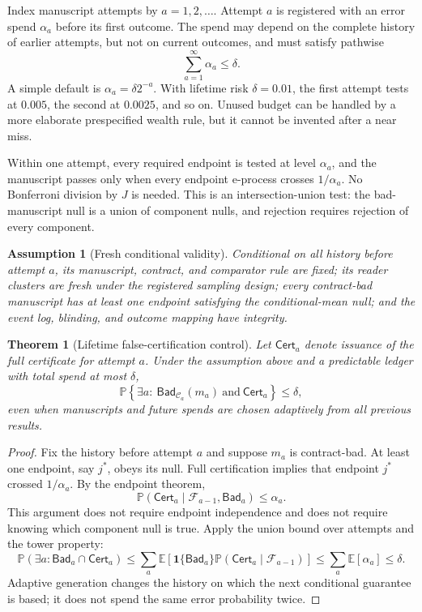 \documentclass[11pt]{article}
\newtheorem{assumption}{Assumption}
\newtheorem{theorem}{Theorem}
\theoremstyle{remark}
\newcommand{\bad}{\mathsf{Bad}}
\newcommand{\cert}{\mathsf{Cert}}
\newcommand{\E}{\mathbb{E}}
\newcommand{\Prb}{\mathbb{P}}
\newcommand{\ind}{\mathbf{1}}
\begin{document}
Index manuscript attempts by $a=1,2,\ldots$. Attempt $a$ is registered with an error spend
$\alpha_a$ before its first outcome. The spend may depend on the complete history of earlier
attempts, but not on current outcomes, and must satisfy pathwise
\[
  \sum_{a=1}^{\infty}\alpha_a\leq\delta.
\]
A simple default is $\alpha_a=\delta 2^{-a}$. With lifetime risk $\delta=0.01$, the first
attempt tests at $0.005$, the second at $0.0025$, and so on. Unused budget can be handled by a
more elaborate prespecified wealth rule, but it cannot be invented after a near miss.

Within one attempt, every required endpoint is tested at level $\alpha_a$, and the manuscript
passes only when every endpoint e-process crosses $1/\alpha_a$. No Bonferroni division by
$J$ is needed. This is an intersection-union test: the bad-manuscript null is a union of
component nulls, and rejection requires rejection of every component.

\begin{assumption}[Fresh conditional validity]
Conditional on all history before attempt $a$, its manuscript, contract, and comparator rule
are fixed; its reader clusters are fresh under the registered sampling design; every
contract-bad manuscript has at least one endpoint satisfying the conditional-mean null; and
the event log, blinding, and outcome mapping have integrity.
\end{assumption}

\begin{theorem}[Lifetime false-certification control]
Let $\cert_a$ denote issuance of the full certificate for attempt $a$. Under the assumption
above and a predictable ledger with total spend at most $\delta$,
\[
 \Prb\!\left\{\exists a:\ \bad_{\mathcal C_a}(m_a)
                 \ \text{and}\ \cert_a\right\}\leq\delta,
\]
even when manuscripts and future spends are chosen adaptively from all previous results.
\end{theorem}

\begin{proof}
Fix the history before attempt $a$ and suppose $m_a$ is contract-bad. At least one endpoint,
say $j^*$, obeys its null. Full certification implies that endpoint $j^*$ crossed
$1/\alpha_a$. By the endpoint theorem,
\[
 \Prb(\cert_a\mid\mathcal F_{a-1},\bad_a)\leq\alpha_a.
\]
This argument does not require endpoint independence and does not require knowing which
component null is true. Apply the union bound over attempts and the tower property:
\[
 \Prb(\exists a:\bad_a\cap\cert_a)
 \leq \sum_a \E\!\left[
     \ind\{\bad_a\}\Prb(\cert_a\mid\mathcal F_{a-1})
   \right]
 \leq \sum_a \E[\alpha_a]\leq\delta.
\]
Adaptive generation changes the history on which the next conditional guarantee is based;
it does not spend the same error probability twice.
\end{proof}
\end{document}
